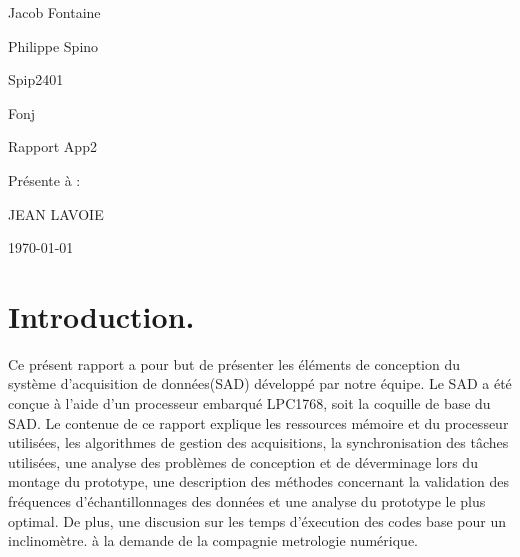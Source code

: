 \documentclass[12pt]{article}
\begin{document}
\begin{titlepage}
	\centering
	{\LARGE Jacob Fontaine \par
	 \LARGE Philippe Spino \par}
	\vspace{1cm}
	\small Spip2401\par
	\small Fonj\par 
	\vspace{3cm}
	{\Large Rapport App2\par}
	\vspace{5cm}
	{\Large Présente à :\par JEAN LAVOIE\par}
	\vspace{4cm}
	\vfill
	{\large \today\par}
\end{titlepage}

\newpage
\tableofcontents
\newpage
\onehalfspacing
\setlength{\parskip}{1em}
\section{Introduction.}
Ce présent rapport a pour but de présenter les éléments de conception du système d'acquisition de données(SAD) développé par notre équipe. Le SAD a été conçue à l'aide d'un processeur embarqué LPC1768, soit la coquille de base du SAD. Le contenue de ce rapport explique les ressources mémoire et du processeur utilisées, les algorithmes de gestion des acquisitions, la synchronisation des tâches utilisées, une analyse des problèmes de conception et de déverminage lors du montage du prototype, une description des méthodes concernant la validation des fréquences d'échantillonnages des données et une analyse du prototype le plus optimal. De plus, une discusion sur les temps d'éxecution des codes base pour un inclinomètre. à la demande de la compagnie metrologie numérique.
\end{document}
